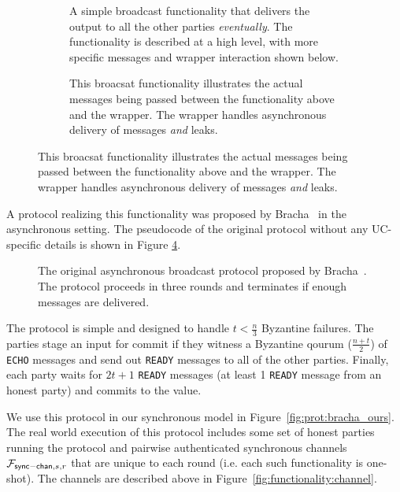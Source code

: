 \begin{figure}
\begin{subfigure}{\textwidth}
	
	\caption{A simple broadcast functionality that delivers the output to all the other parties {\em eventually}. The functionality is described at a high level, with more specific messages and wrapper interaction shown below.}
	\label{fig:functionality:broadcast_import}
\end{subfigure}
\newline
\begin{subfigure}{\textwidth}
	
	\caption{This broacsat functionality illustrates the actual messages being passed between the functionality above and the wrapper. The wrapper handles asynchronous delivery of messages {\em and} leaks.}
	\label{fig:functionality:broadcast_import_real}
\end{subfigure}
\end{figure}
A protocol realizing this functionality was proposed by Bracha~\cite{bracha} in the asynchronous setting.
The pseudocode of the original protocol without any UC-specific details is shown in Figure \ref{fig:protocol:asyncbracha}.

\begin{figure}
\begin{minipage}[t]{0.55\textwidth}
	
	\caption{The original asynchronous broadcast protocol proposed by Bracha~\cite{bracha-broadcast}. The protocol proceeds in three rounds and terminates if enough messages are delivered.}
	\label{fig:protocol:asyncbracha}
\end{minipage}
\end{figure}

The protocol is simple and designed to handle $t < \frac{n}{3}$ Byzantine failures.
The parties stage an input for commit if they witness a Byzantine qourum ($\frac{n+t}{2}$) of \texttt{ECHO} messages and send out \texttt{READY} messages to all of the other parties.
Finally, each party waits for $2t + 1$ \texttt{READY} messages (at least 1 \texttt{READY} message from an honest party) and commits to the value.

We use this protocol in our synchronous model in Figure~\ref{fig:prot:bracha_ours}.
The real world execution of this protocol includes some set of honest parties running the protocol and pairwise authenticated synchronous channels $\mathcal{F}_{{\mathsf {sync-chan}},s,r}$ that are unique to each round (i.e. each such functionality is one-shot).
The channels are described above in Figure~\ref{fig:functionality:channel}.

